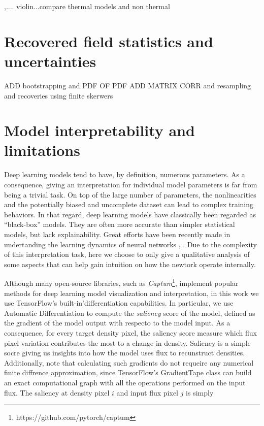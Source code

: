  ,.... violin...compare thermal models and non thermal










\section{Recovered field statistics and uncertainties}\label{sec:recovered statistics}
ADD bootstrapping and PDF OF PDF
ADD MATRIX CORR and resampling and recoveries using finite skerwers





\section{Model interpretability and limitations}
Deep learning models tend to have, by definition, numerous parameters. As a consequence, giving an interpretation for individual model parameters is far from being a trivial task. On top of the large number of parameters, the nonlinearities and the potentially biased and uncomplete dataset can lead to complex training behaviors. In that regard, deep learning models have classically been regarded as ``black-box'' models. They are often more accurate than simpler statistical models, but lack explainability. Great efforts have been recently made in undertanding the learning dynamics of neural networks \cite{shwartzziv2017opening}, \cite{buhrmester2019analysis}.
Due to the complexity of this interpretation task, here we choose to only give a qualitative analysis of some aspects that can help gain intuition on how the newtork operate internally.

Although many open-source libraries, such as \textit{Captum}\footnote{https://github.com/pytorch/captum}, implement popular methods for deep learning model visualization and interpretation, in this work we use TensorFlow's built-in'differentiation capabilities. In particular, we use Automatic Differentiation to compute the \textit{saliency} score of the model, defined as the gradient of the model output with respecto to the model input. As a consequence, for every target density pixel, the saliency score measure which flux pixel variation contributes the most to a change in density. Saliency is a simple socre giving us insights into how the model uses flux to recunstruct densities. Additionally, note that calculating such gradients do not requeire any numerical finite diffrence approximation, since TensorFlow's GradientTape class can build an exact computational graph with all the operations performed on the input flux. The saliency at density pixel $i$ and input flux pixel $j$ is simply

